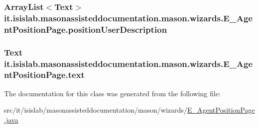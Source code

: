 \hypertarget{classit_1_1isislab_1_1masonassisteddocumentation_1_1mason_1_1wizards_1_1_e___agent_position_page_a09e8462701fa4668917f97c2c2703a2c}{
\subsubsection[{position\-User\-Description}]{\setlength{\rightskip}{0pt plus 5cm}Array\-List$<$Text$>$ it.\-isislab.\-masonassisteddocumentation.\-mason.\-wizards.\-E\-\_\-\-Agent\-Position\-Page.\-position\-User\-Description\hspace{0.3cm}{\ttfamily [private]}}}\label{classit_1_1isislab_1_1masonassisteddocumentation_1_1mason_1_1wizards_1_1_e___agent_position_page_a09e8462701fa4668917f97c2c2703a2c}
\hypertarget{classit_1_1isislab_1_1masonassisteddocumentation_1_1mason_1_1wizards_1_1_e___agent_position_page_aa1fe38181afe24af4925ce05d88ae0f6}{
\subsubsection[{text}]{\setlength{\rightskip}{0pt plus 5cm}Text it.\-isislab.\-masonassisteddocumentation.\-mason.\-wizards.\-E\-\_\-\-Agent\-Position\-Page.\-text\hspace{0.3cm}{\ttfamily [private]}}}\label{classit_1_1isislab_1_1masonassisteddocumentation_1_1mason_1_1wizards_1_1_e___agent_position_page_aa1fe38181afe24af4925ce05d88ae0f6}


The documentation for this class was generated from the following file\-:\begin{DoxyCompactItemize}
\item 
src/it/isislab/masonassisteddocumentation/mason/wizards/\hyperlink{_e___agent_position_page_8java}{E\-\_\-\-Agent\-Position\-Page.\-java}\end{DoxyCompactItemize}
